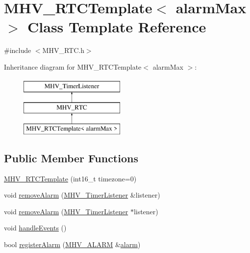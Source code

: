 \hypertarget{class_m_h_v___r_t_c_template}{\section{M\-H\-V\-\_\-\-R\-T\-C\-Template$<$ alarm\-Max $>$ Class Template Reference}
\label{class_m_h_v___r_t_c_template}
}


{\ttfamily \#include $<$M\-H\-V\-\_\-\-R\-T\-C.\-h$>$}

Inheritance diagram for M\-H\-V\-\_\-\-R\-T\-C\-Template$<$ alarm\-Max $>$\-:\begin{figure}[H]
\begin{center}
\leavevmode
\includegraphics[height=3.000000cm]{class_m_h_v___r_t_c_template}
\end{center}
\end{figure}
\subsection*{Public Member Functions}
\begin{DoxyCompactItemize}
\item 
\hyperlink{class_m_h_v___r_t_c_template_a4aadb2bbb51ab6a367a36460e506152b}{M\-H\-V\-\_\-\-R\-T\-C\-Template} (int16\-\_\-t timezone=0)
\item 
void \hyperlink{class_m_h_v___r_t_c_template_a9c21b20f08d659d7fd23733178bf415e}{remove\-Alarm} (\hyperlink{class_m_h_v___timer_listener}{M\-H\-V\-\_\-\-Timer\-Listener} \&listener)
\item 
void \hyperlink{class_m_h_v___r_t_c_template_ac8b774085133a5d98ef507251232bb75}{remove\-Alarm} (\hyperlink{class_m_h_v___timer_listener}{M\-H\-V\-\_\-\-Timer\-Listener} $\ast$listener)
\item 
void \hyperlink{class_m_h_v___r_t_c_template_a7032d5ee95b422be71b7fa2c29853165}{handle\-Events} ()
\item 
bool \hyperlink{class_m_h_v___r_t_c_template_a500eed011af3dbe6b80487a498db262d}{register\-Alarm} (\hyperlink{_m_h_v___r_t_c_8h_af13307658f41fba330ffae04dd5cbce6}{M\-H\-V\-\_\-\-A\-L\-A\-R\-M} \&\hyperlink{class_m_h_v___r_t_c_a949570f89977560cc68dc909e7d0a805}{alarm})
\end{DoxyCompactItemize}
